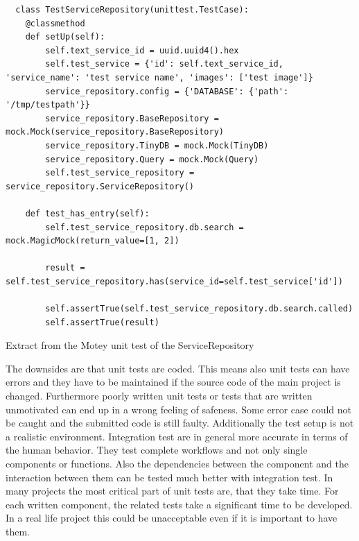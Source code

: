 \begin{listing}[H]
  \begin{verbatim}
  class TestServiceRepository(unittest.TestCase):
    @classmethod
    def setUp(self):
        self.text_service_id = uuid.uuid4().hex
        self.test_service = {'id': self.text_service_id, 'service_name': 'test service name', 'images': ['test image']}
        service_repository.config = {'DATABASE': {'path': '/tmp/testpath'}}
        service_repository.BaseRepository = mock.Mock(service_repository.BaseRepository)
        service_repository.TinyDB = mock.Mock(TinyDB)
        service_repository.Query = mock.Mock(Query)
        self.test_service_repository = service_repository.ServiceRepository()

    def test_has_entry(self):
        self.test_service_repository.db.search = mock.MagicMock(return_value=[1, 2])

        result = self.test_service_repository.has(service_id=self.test_service['id'])

        self.assertTrue(self.test_service_repository.db.search.called)
        self.assertTrue(result)
  \end{verbatim}
  \caption{Extract from the Motey unit test of the ServiceRepository}
  \label{code:sample_unit_test}
\end{listing}

The downsides are that unit tests are coded.
This means also unit tests can have errors and they have to be maintained if the source code of the main project is changed.
Furthermore poorly written unit tests or tests that are written unmotivated can end up in a wrong feeling of safeness.
Some error case could not be caught and the submitted code is still faulty.
Additionally the test setup is not a realistic environment.
Integration test are in general more accurate in terms of the human behavior.
They test complete workflows and not only single components or functions.
Also the dependencies between the component and the interaction between them can be tested much better with integration test.
In many projects the most critical part of unit tests are, that they take time.
For each written component, the related tests take a significant time to be developed.
In a real life project this could be unacceptable even if it is important to have them.\newline

